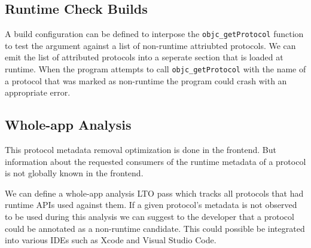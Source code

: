 \documentclass{article}
\begin{document}
\subsection{Runtime Check Builds}

A build configuration can be defined to interpose the \verb|objc_getProtocol|
function to test the argument against a list of non-runtime attriubted protocols.
We can emit the list of attributed protocols into a seperate section that is
loaded at runtime. When the program attempts to call \verb|objc_getProtocol|
with the name of a protocol that was marked as non-runtime the program could
crash with an appropriate error.

\subsection{Whole-app Analysis}

This protocol metadata removal optimization is done in the frontend. But
information about the requested consumers of the runtime metadata of a protocol
is not globally known in the frontend.

We can define a whole-app analysis LTO pass which tracks all protocols that had
runtime APIs used against them. If a given protocol's metadata is not observed
to be used during this analysis we can suggest to the developer that a protocol
could be annotated as a non-runtime candidate. This could possible be integrated
into various IDEs such as Xcode and Visual Studio Code.
\end{document}
